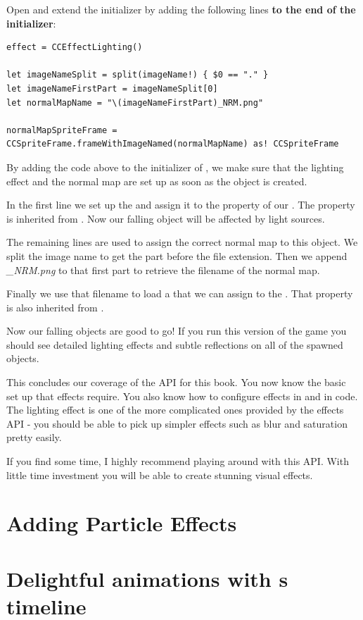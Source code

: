 \begin{leftbar}
Open  and extend the 
initializer by adding the following lines \textbf{to the end of the
initializer}:
\begin{lstlisting}
effect = CCEffectLighting()
    
let imageNameSplit = split(imageName!) { $0 == "." }
let imageNameFirstPart = imageNameSplit[0]
let normalMapName = "\(imageNameFirstPart)_NRM.png"

normalMapSpriteFrame = CCSpriteFrame.frameWithImageNamed(normalMapName) as! CCSpriteFrame
\end{lstlisting}
\end{leftbar}

By adding the code above to the initializer of , we
make sure that the lighting effect and the normal map are set up as soon as the
object is created.

In the first line we set up the  and assign it to
the  property of our . The
 property is inherited from . Now our
falling object will be affected by light sources.

The remaining lines are used to assign the correct normal map to this object. We
split the image name to get the part before the file extension. Then we append
\textit{\_NRM.png} to that first part to retrieve the filename of the normal
map.

Finally we use that filename to load a  that we can
assign to the . That property is also inherited
from .

Now our falling objects are good to go! If you run this version of the game you
should see detailed lighting effects and subtle reflections on all of the
spawned objects.

This concludes our coverage of the  API for this book. You
now know the basic set up that effects require. You also know how to configure
effects in \SB{} and in code. The lighting effect is one of the more complicated
ones provided by the effects API - you should be able to pick up simpler effects
such as blur and saturation pretty easily.

If you find some time, I highly recommend playing around with this API. With
little time investment you will be able to create stunning visual effects.

\section{Adding Particle Effects}


\section{Delightful animations with \SB{}s timeline}

